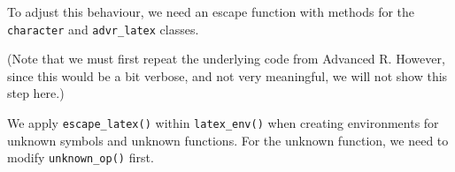 \documentclass[
]{krantz}
\makeatletter
\newenvironment{Shaded}{\begin{snugshade}}{\end{snugshade}}
\newcommand{\CharTok}[1]{\textcolor[rgb]{0.31,0.60,0.02}{#1}}
\newcommand{\ControlFlowTok}[1]{\textcolor[rgb]{0.13,0.29,0.53}{\textbf{#1}}}
\newcommand{\KeywordTok}[1]{\textcolor[rgb]{0.13,0.29,0.53}{\textbf{#1}}}
\newcommand{\NormalTok}[1]{#1}
\newcommand{\StringTok}[1]{\textcolor[rgb]{0.31,0.60,0.02}{#1}}
\newenvironment{kframe}{%
\medskip{}
\setlength{\fboxsep}{.8em}
 \def\at@end@of@kframe{}%
 \ifinner\ifhmode%
  \def\at@end@of@kframe{\end{minipage}}%
  \begin{minipage}{\columnwidth}%
 \fi\fi%
 \def\FrameCommand##1{\hskip\@totalleftmargin \hskip-\fboxsep
 \colorbox{shadecolor}{##1}\hskip-\fboxsep
     \hskip-\linewidth \hskip-\@totalleftmargin \hskip\columnwidth}%
 \MakeFramed {\advance\hsize-\width
   \@totalleftmargin\z@ \linewidth\hsize
   \@setminipage}}%
 {\par\unskip\endMakeFramed%
 \at@end@of@kframe}
\renewenvironment{Shaded}{\begin{kframe}}{\end{kframe}}
\renewcommand{\KeywordTok} [1]{\textcolor[rgb]{0.00,0.44,0.13}{{#1}}}
\renewcommand{\CharTok}    [1]{\textcolor[rgb]{0.25,0.44,0.63}{{#1}}}
\renewcommand{\StringTok}  [1]{\textcolor[rgb]{0.25,0.44,0.63}{{#1}}}
\renewcommand{\NormalTok}  [1]{{#1}}
\makeatother
\begin{document}
To adjust this behaviour, we need an escape function with methods for the \texttt{character} and \texttt{advr\_latex} classes.

(Note that we must first repeat the underlying code from Advanced R. However, since this would be a bit verbose, and not very meaningful, we will not show this step here.)

\begin{Shaded}
\end{Shaded}

We apply \texttt{escape\_latex()} within \texttt{latex\_env()} when creating environments for unknown symbols and unknown functions. For the unknown function, we need to modify \texttt{unknown\_op()} first.
\end{document}
